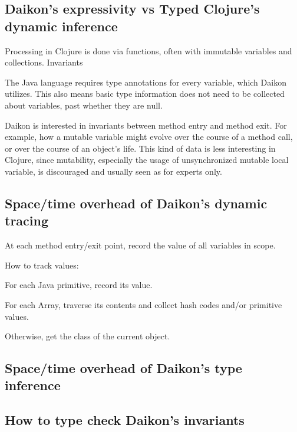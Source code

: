 \subsection{Daikon's expressivity vs Typed Clojure's dynamic inference}


Processing in Clojure is done via functions, often with immutable variables and collections.
Invariants 

The Java language requires type annotations for every variable, which Daikon utilizes.
This also means basic type information does not need to be collected about variables,
past whether they are null.

Daikon is interested in invariants between method entry and method exit. For example,
how a mutable variable might evolve over the course of a method call, or over the course
of an object's life. This kind of data is less interesting in Clojure, since mutability,
especially the usage of unsynchronized mutable local variable, is discouraged and usually
seen as for experts only.


\subsection{Space/time overhead of Daikon's dynamic tracing}

At each method entry/exit point, record the value of all variables in scope.

How to track values:

For each Java primitive, record its value.

For each Array, traverse its contents and collect hash codes
and/or primitive values.

Otherwise, get the class of the current object.

\subsection{Space/time overhead of Daikon's type inference}

\subsection{How to type check Daikon's invariants}

